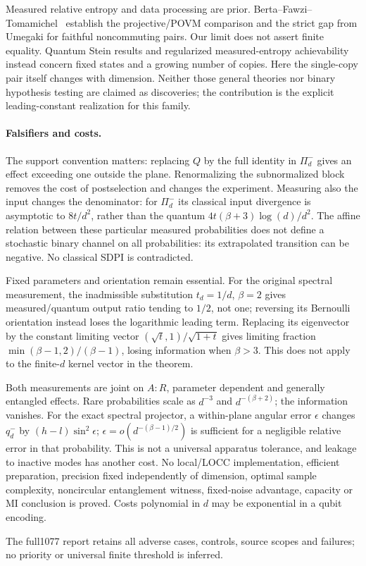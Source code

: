 Measured relative entropy and data processing are prior. Berta--Fawzi--Tomamichel~\cite{BFT} establish the projective/POVM comparison and the strict gap from Umegaki for faithful noncommuting pairs. Our limit does not assert finite equality. Quantum Stein results and regularized measured-entropy achievability~\cite{OH} instead concern fixed states and a growing number of copies. Here the single-copy pair itself changes with dimension. Neither those general theories nor binary hypothesis testing are claimed as discoveries; the contribution is the explicit leading-constant realization for this family.

\paragraph{Falsifiers and costs.}
The support convention matters: replacing $Q$ by the full identity in $\Pi_d^-$ gives an effect exceeding one outside the plane. Renormalizing the subnormalized block removes the cost of postselection and changes the experiment. Measuring also the input changes the denominator: for $\Pi_d^-$ its classical input divergence is asymptotic to $8t/d^2$, rather than the quantum $4t(\beta+3)\log(d)/d^2$. The affine relation between these particular measured probabilities does not define a stochastic binary channel on all probabilities: its extrapolated transition can be negative. No classical SDPI is contradicted.

Fixed parameters and orientation remain essential. For the original spectral measurement, the inadmissible substitution $t_d=1/d$, $\beta=2$ gives measured/quantum output ratio tending to $1/2$, not one; reversing its Bernoulli orientation instead loses the logarithmic leading term. Replacing its eigenvector by the constant limiting vector $(\sqrt t,1)/\sqrt{1+t}$ gives limiting fraction $\min(\beta-1,2)/(\beta-1)$, losing information when $\beta>3$. This does not apply to the finite-$d$ kernel vector in the theorem.

Both measurements are joint on $A:R$, parameter dependent and generally entangled effects. Rare probabilities scale as $d^{-3}$ and $d^{-(\beta+2)}$; the information vanishes. For the exact spectral projector, a within-plane angular error $\epsilon$ changes $q_d^-$ by $(h-l)\sin^2\epsilon$; $\epsilon=o(d^{-(\beta-1)/2})$ is sufficient for a negligible relative error in that probability. This is not a universal apparatus tolerance, and leakage to inactive modes has another cost. No local/LOCC implementation, efficient preparation, precision fixed independently of dimension, optimal sample complexity, noncircular entanglement witness, fixed-noise advantage, capacity or MI conclusion is proved. Costs polynomial in $d$ may be exponential in a qubit encoding.

The full1077 report retains all adverse cases, controls, source scopes and failures; no priority or universal finite threshold is inferred.
